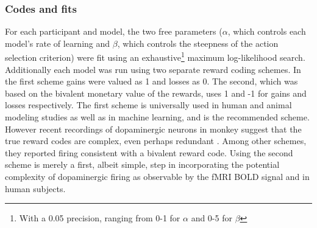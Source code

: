 \subsubsection{Codes and fits}
\label{subsub:codesandfits}
For each participant and model, the two free parameters ($\alpha$, which controls each model's rate of learning and $\beta$, which controls the steepness of the action selection criterion) were fit using an exhaustive\footnote{With a 0.05 precision, ranging from 0-1 for $\alpha$ and 0-5 for $\beta$} maximum log-likelihood search.  Additionally each model was run using two separate reward coding schemes.  In the first scheme gains were valued as 1 and losses as 0.  The second, which was based on the bivalent monetary value of the rewards, uses 1 and -1 for gains and losses respectively.  The first scheme is universally used in human and animal modeling studies as well as in machine learning, and is the \citep{Sutton:1998p9247} recommended scheme.  However recent recordings of dopaminergic neurons in monkey suggest that the true reward codes are complex, even perhaps redundant \citep{Kim:2006p1063,Matsumoto:2009p7219}.  Among other schemes, they reported firing consistent with a bivalent reward code.  Using the second scheme is merely a first, albeit simple, step in incorporating the potential complexity of dopaminergic firing as observable by the fMRI BOLD signal and in human subjects.

